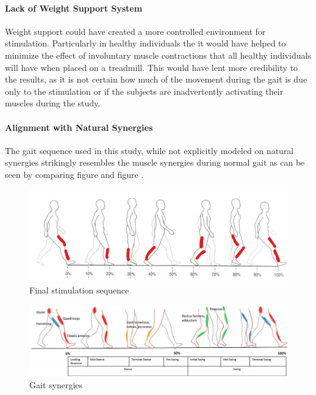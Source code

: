 \paragraph*{Lack of Weight Support System}
Weight support could have created a more controlled environment for stimulation. Particularly in healthy individuals the it would have helped to minimize the effect of involuntary muscle contractions that all healthy individuals will have when placed on a treadmill. This would have lent more credibility to the results, as it is not certain how much of the movement during the gait is due only to the stimulation or if the subjects are inadvertently activating their muscles during the study.
\newline 

\paragraph*{Alignment with Natural Synergies}

The gait sequence used in this study, while not explicitly modeled on natural synergies strikingly resembles the muscle synergies during normal gait as can be seen by comparing figure and figure .

\begin{figure}[h]
    \centering
    \includegraphics[width=0.9\linewidth]{images/gait_cycle_stim_seq.png}
    \caption{Final stimulation sequence}
    \label{fig:enter-label}
\end{figure}
\begin{figure} [h]
    \centering
    \includegraphics[width=0.9\linewidth]{images/synergies.png}
    \caption{Gait synergies \cite{magrath_systematic_2022}}
    \label{fig:enter-label}
\end{figure}


